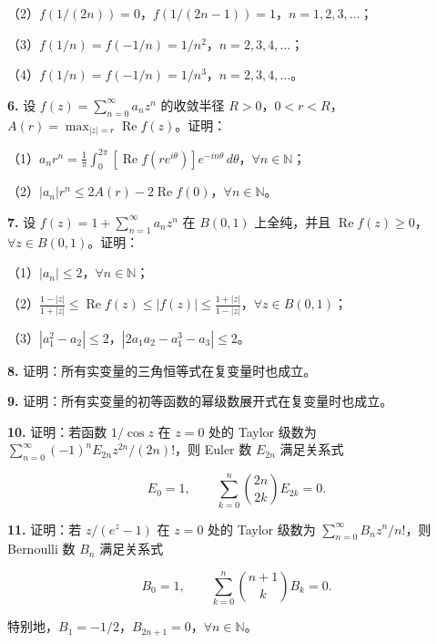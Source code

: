 \documentclass[11pt,a4paper]{article}
\begin{document}
（2）\(f(1/(2n))=0\)，\(f(1/(2n-1))=1\)，\(n=1,2,3,\ldots\)；

（3）\(f(1/n)=f(-1/n)=1/n^2\)，\(n=2,3,4,\ldots\)；

（4）\(f(1/n)=f(-1/n)=1/n^3\)，\(n=2,3,4,\ldots\)。

\par{}
\noindent\textbf{6.} 设 \(f(z)=\sum_{n=0}^{\infty}a_nz^n\) 的收敛半径
\(R>0\)，\(0<r<R\)，\(A(r)=\max_{|z|=r}\operatorname{Re}f(z)\)。证明：

（1）\(\displaystyle a_nr^n=\frac1\pi\int_0^{2\pi}[\operatorname{Re}f(re^{i\theta})]e^{-in\theta}\,d\theta\)，\(\forall n\in\mathbb N\)；

（2）\(|a_n|r^n\le2A(r)-2\operatorname{Re}f(0)\)，\(\forall n\in\mathbb N\)。

\par{}
\noindent\textbf{7.} 设 \(f(z)=1+\sum_{n=1}^{\infty}a_nz^n\) 在 \(B(0,1)\)
上全纯，并且
\(\operatorname{Re}f(z)\ge0\)，\(\forall z\in B(0,1)\)。证明：

（1）\(|a_n|\le2\)，\(\forall n\in\mathbb N\)；

（2）\(\displaystyle\frac{1-|z|}{1+|z|}\le\operatorname{Re}f(z)\le|f(z)|\le\frac{1+|z|}{1-|z|}\)，\(\forall z\in B(0,1)\)；

（3）\(|a_1^2-a_2|\le2\)，\(|2a_1a_2-a_1^3-a_3|\le2\)。

\par{}
\noindent\textbf{8.} 证明：所有实变量的三角恒等式在复变量时也成立。

\par{}
\noindent\textbf{9.} 证明：所有实变量的初等函数的幂级数展开式在复变量时也成立。

\par{}
\noindent\textbf{10.} 证明：若函数 \(1/\cos z\) 在 \(z=0\) 处的 Taylor 级数为
\(\sum_{n=0}^{\infty}(-1)^nE_{2n}z^{2n}/(2n)!\)，则 Euler 数 \(E_{2n}\)
满足关系式

\[
E_0=1,\qquad\sum_{k=0}^n\binom{2n}{2k}E_{2k}=0.
\]

\par{}
\noindent\textbf{11.} 证明：若 \(z/(e^z-1)\) 在 \(z=0\) 处的 Taylor 级数为
\(\sum_{n=0}^{\infty}B_nz^n/n!\)，则 Bernoulli 数 \(B_n\) 满足关系式

\[
B_0=1,\qquad\sum_{k=0}^n\binom{n+1}kB_k=0.
\]

特别地，\(B_1=-1/2\)，\(B_{2n+1}=0\)，\(\forall n\in\mathbb N\)。
\end{document}
